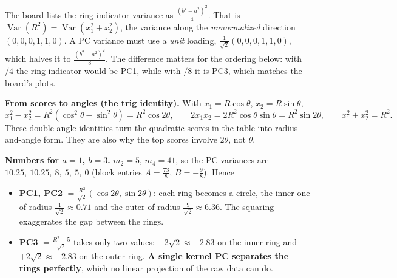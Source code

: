 \documentclass[11pt]{article}
\begin{document}
\begin{careful}
The board lists the ring-indicator variance as $\tfrac{(b^2-a^2)^2}{4}$. That is
$\operatorname{Var}(R^2)=\operatorname{Var}(x_1^2+x_2^2)$, the variance along the
\emph{unnormalized} direction $(0,0,0,1,1,0)$. A PC variance must use a \emph{unit} loading,
$\tfrac1{\sqrt2}(0,0,0,1,1,0)$, which halves it to $\tfrac{(b^2-a^2)^2}{8}$. The difference matters for
the ordering below: with $/4$ the ring indicator would be PC1, while with $/8$ it is PC3, which
matches the board's plots.
\end{careful}

\textbf{From scores to angles (the trig identity).} With $x_1=R\cos\theta$, $x_2=R\sin\theta$,
\[
x_1^2-x_2^2=R^2(\cos^2\theta-\sin^2\theta)=R^2\cos2\theta,\qquad
2x_1x_2=2R^2\cos\theta\sin\theta=R^2\sin2\theta,\qquad x_1^2+x_2^2=R^2 .
\]
These double-angle identities turn the quadratic scores in the table into radius-and-angle
form. They are also why the top scores involve $2\theta$, not $\theta$.

\textbf{Numbers for $a=1$, $b=3$.} $m_2=5$, $m_4=41$, so the PC variances are
$10.25,\ 10.25,\ 8,\ 5,\ 5,\ 0$ (block entries $A=\tfrac{73}{8}$, $B=-\tfrac98$). Hence
\begin{itemize}[nosep]
\item \textbf{PC1, PC2} $=\tfrac{R^2}{\sqrt2}(\cos2\theta,\sin2\theta)$: each ring becomes a circle,
the inner one of radius $\tfrac{1}{\sqrt2}\approx0.71$ and the outer of radius $\tfrac{9}{\sqrt2}\approx6.36$. The
squaring exaggerates the gap between the rings.
\item \textbf{PC3} $=\tfrac{R^2-5}{\sqrt2}$ takes only two values: $-2\sqrt2\approx-2.83$ on the inner ring and
$+2\sqrt2\approx+2.83$ on the outer ring. \textbf{A single kernel PC separates the rings perfectly}, which
no linear projection of the raw data can do.
\end{itemize}
\end{document}
